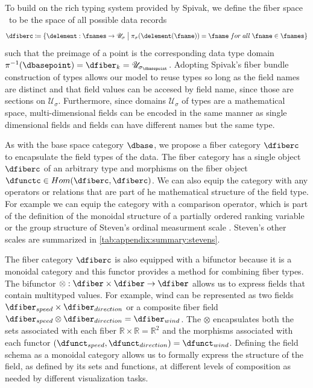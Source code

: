 \documentclass[10pt,journal,compsoc]{IEEEtran}
\theoremstyle{definition}
\theoremstyle{remark}
\begin{document}
To build on the rich typing system provided by Spivak, we define the \textcolor{fiber}{fiber space} \dfiberc\ to be the space of all possible data records
\begin{equation}
  \dfiberc \coloneqq \{\delement: \fnames \rightarrow \mathscr{U}_{\sigma} \bigm{\vert} \pi_{\sigma}(\delement(\fname)) = \fname\;for\;all\; \fname \in \fnames \}
\end{equation}
such that the preimage of a point is the corresponding data type domain $\pi^{-1}(\dbasepoint) = \dfiber_{k} = \mathscr{U}_{{\sigma}_{\dbasepoint}}$. 
Adopting Spivak's fiber bundle construction of types allows our model to reuse types so long as the field names are distinct and that field values can be accesed by field name,  since those are sections on $\mathcal{U}_{\sigma}$. Furthermore, since domains $\mathscr{U}_{{\sigma}}$ of types are a mathematical space, multi-dimensional fields can be encoded in the same manner as single dimensional fields and fields can have different names but the same type. 


As with the base space category $\mathcal{\dbase}$, we propose a fiber category $\mathcal{\dfiberc}$ to encapsulate the field types of the data. The fiber category has a single object $\dfiberc$ of an arbitrary type and morphisms on the fiber object $\dfunctc \in Hom(\dfiberc, \dfiberc)$. We can also equip the category with any operators or relations that are part of he mathematical structure of the field type. For example we can equip the category with a comparison operator, which is part of the definition of the monoidal structure of a partially ordered ranking variable \cite{bruggemannRankingPrioritizationMultiindicator2011} or the group structure of Steven's ordinal measurment scale \cite{stevensTheoryScalesMeasurement1946, leaFormalizationMeasurementScale, thomasMathematizationNotMeasurement2014}. Steven's other scales are summarized in \autoref{tab:appendix:summary:stevens}. 

The fiber category $\mathcal{\dfiberc}$ is also equipped with a bifunctor because it is a monoidal category and this functor provides a method for combining fiber types. The bifunctor $\otimes: \mathcal{\dfiber} \times \mathcal{\dfiber} \rightarrow \mathcal{\dfiber}$ allows us to express fields that contain multityped values. For example, wind can be represented as two fields $\dfiber_{speed} \times \dfiber_{direction}$ or a composite fiber field $\dfiber_{speed} \otimes \dfiber_{direction} = \dfiber_{wind}$. The $\otimes$ encapsulates both the sets associated with each fiber $\mathbb{R} \times \mathbb{R} = \mathbb{R}^{2}$ and the morphisms associated with each functor $(\dfunct_{speed}, \dfunct_{direction}) = \dfunct_{wind}$. Defining the field schema as a monoidal category allows us to formally express the structure of the field, as defined by its sets and functions, at different levels of composition as needed by different visualization tasks.
 \
\end{document}
